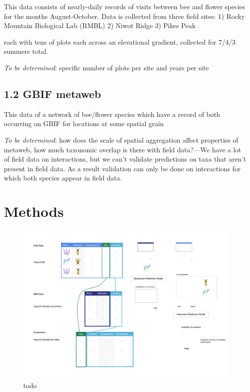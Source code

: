 \documentclass[11pt]{article}
\makeatletter
\def\maxwidth{\ifdim\Gin@nat@width>\linewidth\linewidth
\else\Gin@nat@width\fi}
\let\Oldincludegraphics\includegraphics
\renewcommand{\includegraphics}[1]{\Oldincludegraphics[width=\maxwidth]{#1}}
\makeatother
\begin{document}
This data consists of nearly-daily records of visits between bee and
flower species for the months August-October. Data is collected from
three field sites: 1) Rocky Mountain Biological Lab (RMBL) 2) Niwot
Ridge 3) Pikes Peak

each with tens of plots each across an elevational gradient, collected
for 7/4/3 summers total.

\emph{To be determined}: specific number of plots per site and years per
site

\hypertarget{gbif-metaweb}{%
\subsection{1.2 GBIF metaweb}\label{gbif-metaweb}}

This data of a network of bee/flower species which have a record of both
occurring on GBIF for locations at some spatial grain

\emph{To be determined}: how does the scale of spatial aggregation
affect properties of metaweb, how much taxonomic overlap is there with
field data?---We have a lot of field data on interactions, but we can't
validate predictions on taxa that aren't present in field data. As a
result validation can only be done on interactions for which both
species appear in field data.

\hypertarget{methods}{%
\section{Methods}\label{methods}}

\begin{figure}
\hypertarget{fig:concept}{%
\centering
\includegraphics{./figures/concept.png}
\caption{todo}\label{fig:concept}
}
\end{figure}
\end{document}
